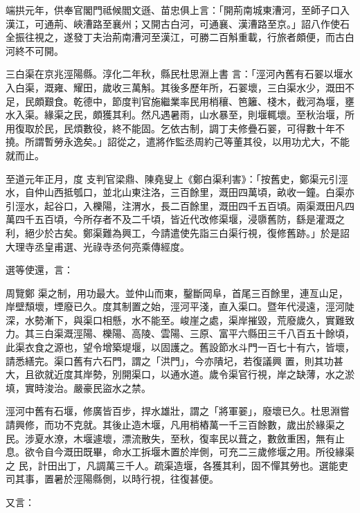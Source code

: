 \begin{pinyinscope}
 端拱元年，供奉官閣門祗候閻文遜、苗忠俱上言：「開荊南城東漕河，至師子口入漢江，可通荊、峽漕路至襄州；又開古白河，可通襄、漢漕路至京。」詔八作使石全振往視之，遂發丁夫治荊南漕河至漢江，可勝二百斛重載，行旅者頗便，而古白河終不可開。



 三白渠在京兆涇陽縣。淳化二年秋，縣民杜思淵上書
 言：「涇河內舊有石翣以堰水入白渠，溉雍、耀田，歲收三萬斛。其後多歷年所，石翣壞，三白渠水少，溉田不足，民頗艱食。乾德中，節度判官施繼業率民用梢穰、笆籬、棧木，截河為堰，壅水入渠。緣渠之民，頗獲其利。然凡遇暑雨，山水暴至，則堰輒壞。至秋治堰，所用復取於民，民煩數役，終不能固。乞依古制，調丁夫修疊石翣，可得數十年不撓。所謂暫勞永逸矣。」詔從之，遣將作監丞周約己等董其役，以用功尤大，不能就而止。



 至道元年正月，度
 支判官梁鼎、陳堯叟上《鄭白渠利害》：「按舊史，鄭渠元引涇水，自仲山西抵瓠口，並北山東注洛，三百餘里，溉田四萬頃，畝收一鐘。白渠亦引涇水，起谷口，入櫟陽，注渭水，長二百餘里，溉田四千五百頃。兩渠溉田凡四萬四千五百頃，今所存者不及二千頃，皆近代改修渠堰，浸隳舊防，繇是灌溉之利，絕少於古矣。鄭渠難為興工，今請遣使先詣三白渠行視，復修舊跡。」於是詔大理寺丞皇甫選、光祿寺丞何亮乘傳經度。



 選等使還，言：



 周覽鄭
 渠之制，用功最大。並仲山而東，鑿斷岡阜，首尾三百餘里，連亙山足，岸壁頹壞，堙廢已久。度其制置之始，涇河平淺，直入渠口。暨年代浸遠，涇河陡深，水勢漸下，與渠口相懸，水不能至。峻崖之處，渠岸摧毀，荒廢歲久，實難致力。其三白渠溉涇陽、櫟陽、高陵、雲陽、三原、富平六縣田三千八百五十餘頃，此渠衣食之源也，望令增築堤堰，以固護之。舊設節水斗門一百七十有六，皆壞，請悉繕完。渠口舊有六石門，謂之「洪門」，今亦隤圮，若復議興
 置，則其功甚大，且欲就近度其岸勢，別開渠口，以通水道。歲令渠官行視，岸之缺薄，水之淤填，實時浚治。嚴豪民盜水之禁。



 涇河中舊有石堰，修廣皆百步，捍水雄壯，謂之「將軍翣」，廢壞已久。杜思淵嘗請興修，而功不克就。其後止造木堰，凡用梢樁萬一千三百餘數，歲出於緣渠之民。涉夏水潦，木堰遽壞，漂流散失，至秋，復率民以葺之，數斂重困，無有止息。欲令自今溉田既畢，命水工拆堰木置於岸側，可充二三歲修堰之用。所役緣渠之
 民，計田出丁，凡調萬三千人。疏渠造堰，各獲其利，固不憚其勞也。選能吏司其事，置暑於涇陽縣側，以時行視，往復甚便。



 又言：




\end{pinyinscope}
